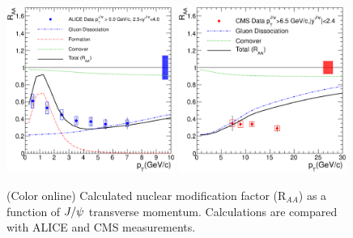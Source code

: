 \documentclass[aps,prc,preprint,superscriptaddress,showpacs,showkeys]{revtex4-1}
\begin{document}
\begin{figure}
\includegraphics[width=0.49\textwidth]{ALICE_RAAPt.eps}
\includegraphics[width=0.49\textwidth]{CMS_RAAPt.eps}
\caption{(Color online) Calculated nuclear modification factor (R$_{AA}$) as a function of $J/\psi$ transverse momentum. Calculations are
compared with ALICE and CMS measurements.}
\label{fig:JPsiRaaVsPt}
\end{figure}


\end{document}

